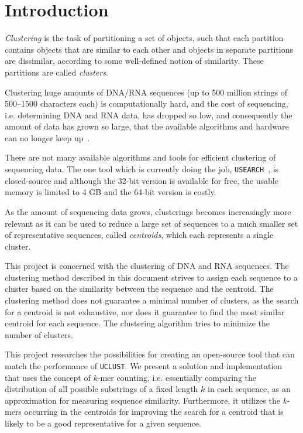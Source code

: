 \section{Introduction}
\label{sec:introduction}

\emph{Clustering} is the task of partitioning a set of objects, such that each
partition contains objects that are similar to each other and objects in
separate partitions are dissimilar, according to some well-defined notion of
similarity. These partitions are called \emph{clusters}.

Clustering huge amounts of DNA/RNA sequences (up to 500 million strings of
500--1500 characters each) is computationally hard, and the cost of sequencing,
i.e. determining DNA and RNA data, has dropped so low, and consequently the
amount of data has grown so large, that the available algorithms and hardware
can no longer keep up~\cite{rothberg}.

There are not many available algorithms and tools for efficient clustering of
sequencing data. The one tool which is currently doing the job,
\texttt{USEARCH}~\cite{edgar,usearch}, is closed-source and although the 32-bit
version is available for free, the usable memory is limited to 4 GB and the
64-bit version is costly.

As the amount of sequencing data grows, clusterings becomes increasingly more
relevant as it can be used to reduce a large set of sequences to a much smaller
set of representative sequences, called \emph{centroids}, which each represents
a single cluster.

This project is concerned with the clustering of DNA and RNA sequences. The
clustering method described in this document strives to assign each sequence to
a cluster based on the similarity between the sequence and the centroid. The
clustering method does not guarantee a minimal number of clusters, as the
search for a centroid is not exhaustive, nor does it guarantee to find the most
similar centroid for each sequence. The clustering algorithm tries to minimize
the number of clusters.

This project researches the possibilities for creating an open-source tool that
can match the performance of \texttt{UCLUST}. We present a solution and
implementation that uses the concept of $k$-mer counting, i.e. essentially
comparing the distribution of all possible substrings of a fixed length $k$ in
each sequence, as an approximation for measuring sequence similarity.
Furthermore, it utilizes the $k$-mers occurring in the centroids for improving
the search for a centroid that is likely to be a good representative for a
given sequence. %


